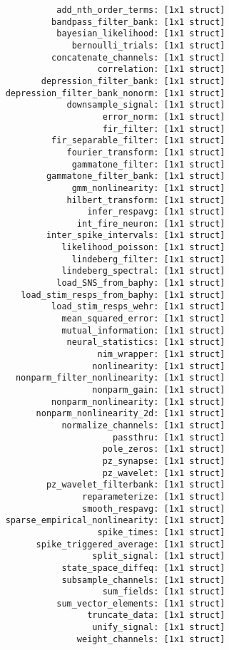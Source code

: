 \documentclass[letterpaper]{report}
\begin{document}
\begin{verbatim}
              add_nth_order_terms: [1x1 struct]
             bandpass_filter_bank: [1x1 struct]
              bayesian_likelihood: [1x1 struct]
                 bernoulli_trials: [1x1 struct]
             concatenate_channels: [1x1 struct]
                      correlation: [1x1 struct]
           depression_filter_bank: [1x1 struct]
    depression_filter_bank_nonorm: [1x1 struct]
                downsample_signal: [1x1 struct]
                       error_norm: [1x1 struct]
                       fir_filter: [1x1 struct]
             fir_separable_filter: [1x1 struct]
                fourier_transform: [1x1 struct]
                 gammatone_filter: [1x1 struct]
            gammatone_filter_bank: [1x1 struct]
                 gmm_nonlinearity: [1x1 struct]
                hilbert_transform: [1x1 struct]
                    infer_respavg: [1x1 struct]
                  int_fire_neuron: [1x1 struct]
            inter_spike_intervals: [1x1 struct]
               likelihood_poisson: [1x1 struct]
                 lindeberg_filter: [1x1 struct]
               lindeberg_spectral: [1x1 struct]
              load_SNS_from_baphy: [1x1 struct]
       load_stim_resps_from_baphy: [1x1 struct]
             load_stim_resps_wehr: [1x1 struct]
               mean_squared_error: [1x1 struct]
               mutual_information: [1x1 struct]
                neural_statistics: [1x1 struct]
                      nim_wrapper: [1x1 struct]
                     nonlinearity: [1x1 struct]
      nonparm_filter_nonlinearity: [1x1 struct]
                     nonparm_gain: [1x1 struct]
             nonparm_nonlinearity: [1x1 struct]
          nonparm_nonlinearity_2d: [1x1 struct]
               normalize_channels: [1x1 struct]
                         passthru: [1x1 struct]
                       pole_zeros: [1x1 struct]
                       pz_synapse: [1x1 struct]
                       pz_wavelet: [1x1 struct]
            pz_wavelet_filterbank: [1x1 struct]
                   reparameterize: [1x1 struct]
                   smooth_respavg: [1x1 struct]
    sparse_empirical_nonlinearity: [1x1 struct]
                      spike_times: [1x1 struct]
          spike_triggered_average: [1x1 struct]
                     split_signal: [1x1 struct]
               state_space_diffeq: [1x1 struct]
               subsample_channels: [1x1 struct]
                       sum_fields: [1x1 struct]
              sum_vector_elements: [1x1 struct]
                    truncate_data: [1x1 struct]
                     unify_signal: [1x1 struct]
                  weight_channels: [1x1 struct]
\end{verbatim}
\end{document}

